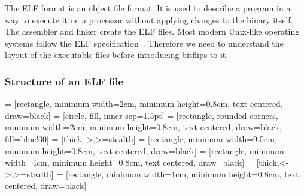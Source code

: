 The ELF format is an object file format. It is used to describe a program in a
way to execute it on a processor without applying changes to the binary itself.
The assembler and linker create the ELF files. Most modern Unix-like operating
systems follow the ELF specification~\cite{elfspec}. Therefore we need to
understand the layout of the executable files before introducing bitflips to it.

\subsubsection{Structure of an ELF file}

 = [rectangle, minimum width=2cm, minimum height=0.8cm,
text centered, draw=black]
 = [circle, fill, inner sep=1.5pt]
 = [rectangle, rounded corners, minimum width=2cm,
minimum height=0.8cm, text centered, draw=black, fill=blue!30]
 = [thick,->,>=stealth]
 = [rectangle, minimum width=9.5cm, minimum
height=0.8cm, text centered, draw=black]
 = [rectangle, minimum width=4cm, minimum
height=0.8cm, text centered, draw=black]
 = [thick,<->,>=stealth]
 = [rectangle, minimum width=1cm, minimum height=0.8cm,
text centered, draw=black]

